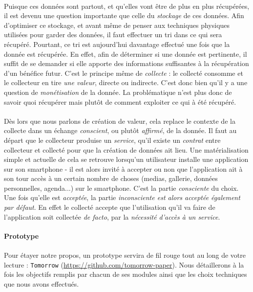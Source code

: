 \paragraph{} Puisque ces données sont partout, et qu'elles vont être de plus en plus récupérées, il est devenu
une question importante que celle du \emph{stockage} de ces données. Afin d'optimiser ce stockage, et avant même de
penser aux techniques physiques utilisées pour garder des données, il faut effectuer un tri dans ce qui sera récupéré.
Pourtant, ce tri est aujourd'hui davantage effectué une fois que la donnée est récupérée. En effet, afin de déterminer
si une donnée est pertinente, il suffit de se demander si elle apporte des informations suffisantes à la récupération
d'un bénéfice futur. C'est le principe même de \emph{collecte} : le collecté consomme et le collecteur en tire \emph{
une valeur}, directe ou indirecte. C'est donc bien qu'il y a une question de \emph{monétisation} de la donnée. La
problématique n'est plus donc de savoir quoi récupérer mais plutôt de comment exploiter ce qui à été récupéré.

\paragraph{} Dès lors que nous parlons de création de valeur, cela replace le contexte de la collecte dans un échange
\emph{conscient}, ou plutôt \emph{affirmé}, de la donnée. Il faut au départ que le collecteur produise un \emph{service},
qu'il existe un \emph{contrat} entre collecteur et collecté pour que la création de données ait lieu. Une matérialisation
simple et actuelle de cela se retrouve lorsqu'un utilisateur installe une application sur son smartphone - il est
alors invité à accepter ou non que l'application ait à son tour accès à un certain nombre de choses (medias, gallerie,
données personnelles, agenda...) sur le smartphone. C'est la partie \emph{consciente} du choix. Une fois qu'elle est
\emph{acceptée}, la partie \emph{inconsciente est alors acceptée également par défaut}. En effet le collecté accepte que
l'utilisation qu'il va faire de l'application soit collectée \emph{de facto}, par la \emph{nécessité d'accès à un service}.

\paragraph{Prototype}

\paragraph{} Pour étayer notre propos, un prototype servira de fil rouge tout au long de votre lecture : \lstinline{Tomorrow}
(\url{https://github.com/tomorrow-paper}). Nous détaillerons à la fois les objectifs remplis par chacun de ses modules
ainsi que les choix techniques que nous avons effectués.

